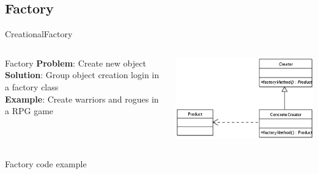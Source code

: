 \documentclass[10pt,compress]{beamer} %
\begin{document}
\subsection[Factory]{Factory}
\begin{frame}[plain]{Creational}{Factory}
    \begin{columns}
	   \begin{block}{Factory}
			\textbf{Problem}: Create new object\\
			\textbf{Solution}: Group object creation login in a factory class\\
			\textbf{Example}: Create warriors and rogues in a RPG game\\
		\end{block}
			\centering\includegraphics[width=\linewidth]{figs/factory}\\
	\end{columns}
	\begin{block}{Factory code example}
	    \vspace{-0.2cm}
	    
		\vspace{-0.2cm}
	\end{block}
\end{frame}
\end{document}
